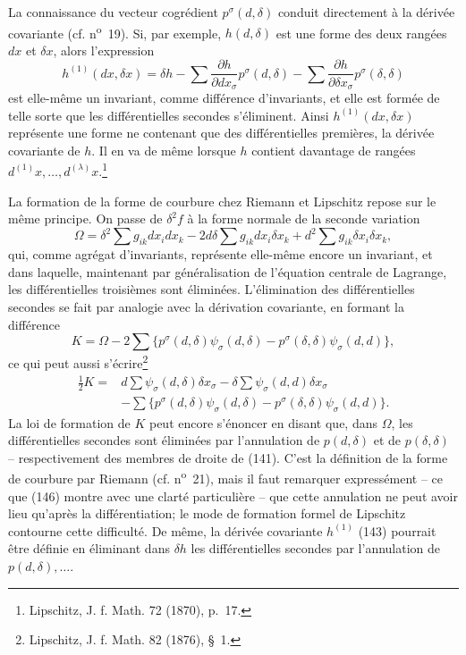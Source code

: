 \documentclass[11pt]{article}
\begin{document}
La connaissance du vecteur cogrédient $p^\sigma(d,\delta)$ conduit directement à la dérivée covariante (cf. n\textsuperscript{o}~19). Si, par exemple, $h(d,\delta)$ est une forme des deux rangées $dx$ et $\delta x$, alors l'expression
\begin{equation}
 h^{(1)}(dx,\delta x)=\delta h-
 \sum\frac{\partial h}{\partial dx_\sigma}p^\sigma(d,\delta)-
 \sum\frac{\partial h}{\partial \delta x_\sigma}p^\sigma(\delta,\delta)
\tag{143}
\end{equation}
est elle-même un invariant, comme différence d'invariants, et elle est formée de telle sorte que les différentielles secondes s'éliminent. Ainsi $h^{(1)}(dx,\delta x)$ représente une forme ne contenant que des différentielles premières, la dérivée covariante de $h$. Il en va de même lorsque $h$ contient davantage de rangées $d^{(1)}x,\ldots,d^{(\lambda)}x$.\footnote{Lipschitz, J. f. Math. 72 (1870), p.~17.}

La formation de la forme de courbure chez Riemann et Lipschitz repose sur le même principe. On passe de $\delta^2 f$ à la \og forme normale de la seconde variation \fg{}
\begin{equation}
 \Omega=\delta^2\sum g_{ik}dx_i dx_k
 -2d\delta\sum g_{ik}dx_i\delta x_k
 +d^2\sum g_{ik}\delta x_i\delta x_k,
\tag{144}
\end{equation}
qui, comme agrégat d'invariants, représente elle-même encore un invariant, et dans laquelle, maintenant par généralisation de l'équation centrale de Lagrange, les différentielles troisièmes sont éliminées. L'élimination des différentielles secondes se fait par analogie avec la dérivation covariante, en formant la différence
\begin{equation}
 K=\Omega-2\sum\{p^\sigma(d,\delta)\psi_\sigma(d,\delta)-p^\sigma(\delta,\delta)\psi_\sigma(d,d)\},
\tag{145}
\end{equation}
ce qui peut aussi s'écrire\footnote{Lipschitz, J. f. Math. 82 (1876), \S~1.}
\begin{equation}
\begin{aligned}
 \frac12 K={}&d\sum\psi_\sigma(d,\delta)\delta x_\sigma
 -\delta\sum\psi_\sigma(d,d)\delta x_\sigma\\
 &-\sum\{p^\sigma(d,\delta)\psi_\sigma(d,\delta)-p^\sigma(\delta,\delta)\psi_\sigma(d,d)\}.
\end{aligned}
\tag{146}
\end{equation}
La loi de formation de $K$ peut encore s'énoncer en disant que, dans $\Omega$, les différentielles secondes sont éliminées par l'annulation de $p(d,\delta)$ et de $p(\delta,\delta)$ -- respectivement des membres de droite de (141). C'est la définition de la forme de courbure par Riemann (cf. n\textsuperscript{o}~21), mais il faut remarquer expressément -- ce que (146) montre avec une clarté particulière -- que cette annulation ne peut avoir lieu qu'après la différentiation; le mode de formation formel de Lipschitz contourne cette difficulté. De même, la dérivée covariante $h^{(1)}$ (143) pourrait être définie en éliminant dans $\delta h$ les différentielles secondes par l'annulation de $p(d,\delta),\ldots$.
\end{document}
